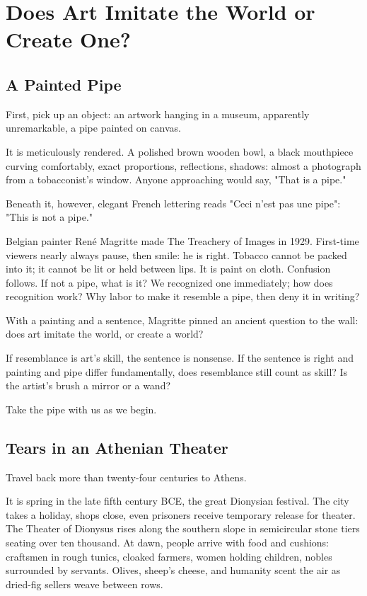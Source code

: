 \chapter[Art: Imitation or Creation?]{Does Art Imitate the World or Create One?}
\section{A Painted Pipe}
First, pick up an object: an artwork hanging in a museum, apparently unremarkable, a pipe painted on canvas.

It is meticulously rendered. A polished brown wooden bowl, a black mouthpiece curving comfortably, exact proportions, reflections, shadows: almost a photograph from a tobacconist's window. Anyone approaching would say, "That is a pipe."

Beneath it, however, elegant French lettering reads "Ceci n'est pas une pipe": "This is not a pipe."

Belgian painter René Magritte made The Treachery of Images in 1929. First-time viewers nearly always pause, then smile: he is right. Tobacco cannot be packed into it; it cannot be lit or held between lips. It is paint on cloth. Confusion follows. If not a pipe, what is it? We recognized one immediately; how does recognition work? Why labor to make it resemble a pipe, then deny it in writing?

With a painting and a sentence, Magritte pinned an ancient question to the wall: does art imitate the world, or create a world?

If resemblance is art's skill, the sentence is nonsense. If the sentence is right and painting and pipe differ fundamentally, does resemblance still count as skill? Is the artist's brush a mirror or a wand?

Take the pipe with us as we begin.

\section{Tears in an Athenian Theater}
Travel back more than twenty-four centuries to Athens.

It is spring in the late fifth century BCE, the great Dionysian festival. The city takes a holiday, shops close, even prisoners receive temporary release for theater. The Theater of Dionysus rises along the southern slope in semicircular stone tiers seating over ten thousand. At dawn, people arrive with food and cushions: craftsmen in rough tunics, cloaked farmers, women holding children, nobles surrounded by servants. Olives, sheep's cheese, and humanity scent the air as dried-fig sellers weave between rows.


